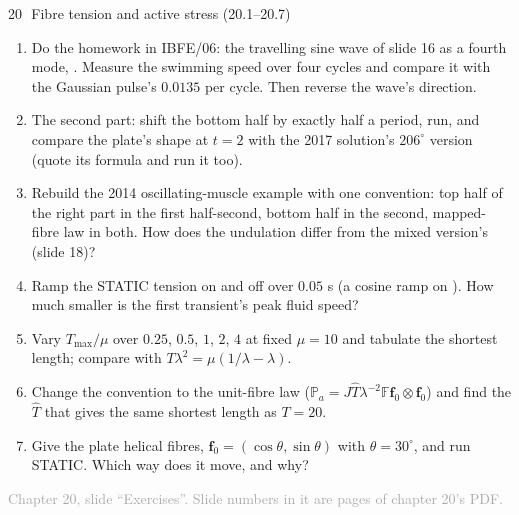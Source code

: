 \documentclass[aspectratio=169,11pt]{beamer}
\newcommand{\sourcecredit}[1]{\vfill\begin{flushright}\tiny\textcolor{DarkGray}{#1}\end{flushright}}
\begin{document}
\begin{frame}{20\,\textbullet\ Fibre tension and active stress (20.1--20.7)}
\label{fr:c20x1}
\footnotesize
\begin{enumerate}
  \item[20.1] Do the homework in IBFE/06: the travelling sine wave of slide 16 as a fourth mode, . Measure the swimming speed over four cycles and compare it with the Gaussian pulse's $0.0135$ per cycle. Then reverse the wave's direction.
  \item[20.2] The second part: shift the bottom half by exactly half a period, run, and compare the plate's shape at $t = 2$ with the 2017 solution's $206^\circ$ version (quote its formula and run it too).
  \item[20.3] Rebuild the 2014 oscillating-muscle example with one convention: top half of the right part in the first half-second, bottom half in the second, mapped-fibre law in both. How does the undulation differ from the mixed version's (slide 18)?
  \item[20.4] Ramp the STATIC tension on and off over $0.05$ s (a cosine ramp on ). How much smaller is the first transient's peak fluid speed?
  \item[20.5] Vary $T_{\max}/\mu$ over $0.25$, $0.5$, $1$, $2$, $4$ at fixed $\mu = 10$ and tabulate the shortest length; compare with $T\lambda^2 = \mu(1/\lambda - \lambda)$.
  \item[20.6] Change the convention to the unit-fibre law ($\mathbb{P}_a = J\widehat{T}\lambda^{-2}\mathbb{F}\mathbf{f}_0\otimes\mathbf{f}_0$) and find the $\widehat{T}$ that gives the same shortest length as $T = 20$.
  \item[20.7] Give the plate helical fibres, $\mathbf{f}_0 = (\cos\theta, \sin\theta)$ with $\theta = 30^\circ$, and run STATIC. Which way does it move, and why?
\end{enumerate}
\sourcecredit{Chapter 20, slide ``Exercises''. Slide numbers in it are pages of chapter 20's PDF.}
\end{frame}
\end{document}
